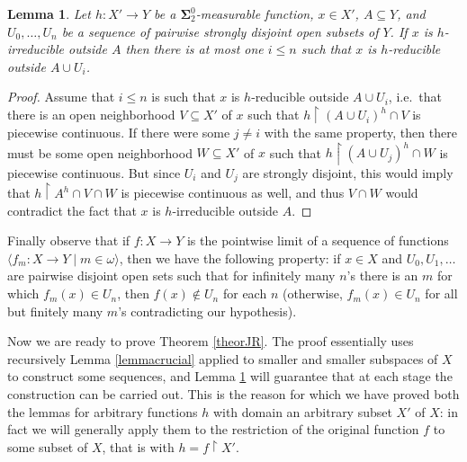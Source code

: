 \documentclass{rae}
\newcommand{\bSigma}{\mathbf{\Sigma}}
\newcommand{\restr}[2]{#1 \restriction #2}
\newcommand{\seq}[2]{\langle #1 \mid  #2 \rangle}
\newtheorem{lemma}[theorem]{Lemma}
\theoremstyle{definition}
\begin{document}
\begin{lemma}\label{lemmagood}
Let $h \colon X' \to Y$ be a $\bSigma^0_2$-measurable function, $x  \in X'$, 
$A \subseteq Y$, and $U_0, \dotsc, U_n$ be a sequence of pairwise strongly disjoint 
open subsets of $Y$. If $x$ is $h$-irreducible outside $A$ 
then there is at most one 
$i\leq n$ such that $x$ is \emph{$h$-reducible} outside $A \cup U_i$.
\end{lemma}

\begin{proof}
Assume that $i \leq n$ is such that $x$ is $h$-reducible outside  $A \cup U_i$, 
i.e.\ that there is an open neighborhood $V \subseteq X'$ of $x$ such that 
$\restr{h}{(A \cup U_i)^h \cap V}$ is piecewise 
continuous. If there were some $j \neq i$ with the same property, then 
there must be some open neighborhood $W \subseteq X'$ of $x$ such that 
$\restr{h}{(A \cup U_j)^h \cap W}$ is piecewise 
continuous. But since $U_i$ and $U_j$ are strongly disjoint, this would 
imply that $\restr{h}{A^h \cap V \cap W}$ is 
piecewise continuous as well, and thus $V \cap W$ would contradict the 
fact that $x$ is $h$-irreducible outside $A$.
\end{proof}

Finally observe that if $f \colon X \to Y$ is the pointwise limit of a 
sequence  of functions $\seq{f_m \colon X \to Y}{m \in \omega}$, 
then we have the following property: if $x \in X$ and $U_0, U_1, \dotsc$ 
are pairwise disjoint open sets such that for infinitely many  $n$'s there 
is an $m$ for which $f_m(x) \in U_n$, then $f(x) \notin U_n$ for each $n$ 
(otherwise, $f_m(x) \in U_n$ for all but finitely many $m$'s contradicting 
our hypothesis).


Now we are ready  to prove Theorem \ref{theorJR}. The proof essentially uses
recursively Lemma \ref{lemmacrucial} applied to smaller and smaller subspaces
of $X$ to construct some sequences, and Lemma \ref{lemmagood} will guarantee that
at each stage the 
construction can be carried out. This is the reason for which we have proved
both the lemmas for arbitrary functions $h$ 
with domain an arbitrary subset $X'$ of $X$: in fact we will generally apply them to the restriction of the original
function $f$ to some subset of $X$, that is with $h = \restr{f}{X'}$.
\end{document}
